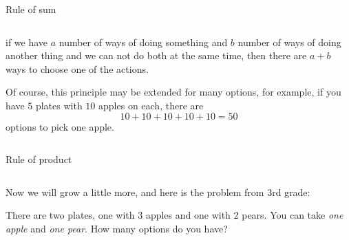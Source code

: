 \documentclass[9pt,aspectratio=169]{beamer}
\begin{document}
\begin{frame}{Rule of sum}
\begin{columns}[T]
\begin{column}{0.5\textwidth}
      \begin{definition}{}
        if we have $a$ number of ways of doing something and $b$ number of ways of doing another thing and we can not do both at the same time, then there are $a + b$ ways to choose one of the actions.
      \end{definition}

      Of course, this principle may be extended for many options, for example, if you have $5$ plates with $10$ apples on each, there are 
      \[10+10+10+10+10 = 50\] 
      options to pick one apple.
    \end{column}
  \end{columns}
\end{frame}

\begin{frame}{Rule of product}
  \begin{columns}[T]
    \begin{column}{0.5\textwidth}
      Now we will grow a little more, and here is the problem from 3rd grade:

      \begin{problem}
        There are two plates, one with $3$ apples and one with $2$ pears. You can take \emph{one apple} and \emph{one pear}. How many options do you have?
      \end{problem}

      \begin{nscenter}
      \end{nscenter}


\end{column}
\end{columns}
\end{frame}
\end{document}
